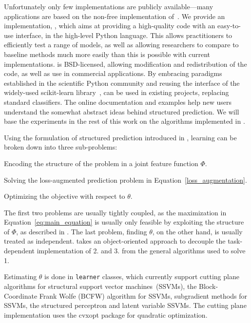 Unfortunately only few implementations are publicly
available---many applications are based on the non-free implementation
of~\citet{joachims2009cutting}.
We provide an implementation, \pystruct, which aims at providing a high-quality
code with an easy-to-use interface, in the high-level Python language.  This
allows practitioners to efficiently test a range of models, as well as allowing
researchers to compare to baseline methods much more easily than this is
possible with current implementations.  \pystruct is BSD-licensed, allowing
modification and redistribution of the code, as well as use in commercial
applications.  By embracing paradigms established in the scientific Python
community and reusing the interface of the widely-used {\sc scikit-learn}
library~\citep{pedregosa2011scikit}, \pystruct can be used in existing
projects, replacing standard classifiers. The online documentation and
examples help new users understand the somewhat abstract ideas behind
structured prediction.
We will base the experiments in the rest of this work on the algorithms
implemented in \pystruct.

Using the formulation of structured prediction introduced in
, learning can be broken down into three
sub-problems:
\begin{enumerate*}
    \item Encoding the structure of the problem in a joint feature function $\Phi$.
    \item Solving the loss-augmented prediction problem in Equation~\eqref{loss_augmentation}.
    \item Optimizing the objective  with respect to $\theta$.
\end{enumerate*}
The first two problems are usually tightly coupled, as the maximization in
Equation~\ref{eq:main_equation} is usually only feasible by exploiting the
structure of $\Phi$, as described in . The last problem,
finding $\theta$, on the other hand, is usually treated as independent.
\pystruct takes an object-oriented approach to decouple the task-dependent
implementation of 2. and 3. from the general algorithms used to solve 1.

Estimating $\theta$ is done in \texttt{learner} classes, which currently
support cutting plane algorithms for structural support vector
machines~(SSVMs), the Block-Coordinate Frank Wolfe (BCFW) algorithm for SSVMs,
subgradient methods for SSVMs, the structured perceptron and latent variable
SSVMs. The cutting plane implementation uses the {\sc cvxopt}
package \citep{dahl2006cvxopt} for quadratic optimization.

